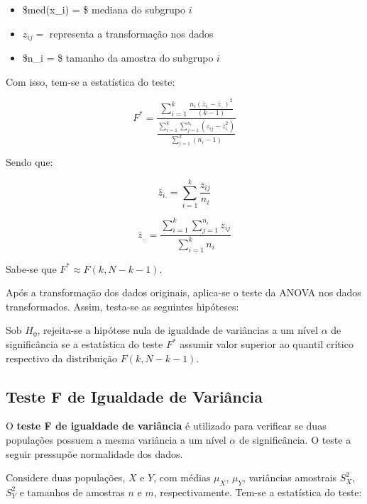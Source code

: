 \documentclass[
]{estat/estat}
\providecommand{\tightlist}{%
  \setlength{\itemsep}{0pt}\setlength{\parskip}{0pt}}\usepackage{longtable,booktabs,array}
\begin{document}
\begin{itemize}
\tightlist
\item
  \$med(x\_i) = \$ mediana do subgrupo \(i\)
\item
  \(z_{ij} =\) representa a transformação nos dados
\item
  \$n\_i = \$ tamanho da amostra do subgrupo \(i\)
\end{itemize}

Com isso, tem-se a estatística do teste:

\begin{equation}
F^* = \frac{\displaystyle \sum_{i=1}^{k}\frac{n_i(\bar{z}_{i.} - \bar{z}_{..})^2}{(k-1)}}{\frac{\displaystyle \sum_{i=1}^{k}\displaystyle \sum_{j=1}^{n_i}(z_{ij}-\bar{z}_{i.}^2)}{\displaystyle \sum_{i=1}^{k}(n_i-1)}} \nonumber
\end{equation}

Sendo que:

\[ \bar{z}_{i.} = \sum_{i=1}^{k}\frac{z_{ij}}{n_{i}} \]

\[ \bar{z}_{..} = \frac{\displaystyle \sum_{i=1}^{k}\displaystyle\sum_{j=1}^{n_i}z_{ij}}{\displaystyle\sum_{i=1}^{k}n_i} \]

Sabe-se que \(F^* \approx F(k,N-k-1)\).

Após a transformação dos dados originais, aplica-se o teste da ANOVA nos
dados transformados. Assim, testa-se as seguintes hipóteses:


Sob \(H_0\), rejeita-se a hipótese nula de igualdade de variâncias a um
nível \(\alpha\) de significância se a estatística do teste \(F^*\)
assumir valor superior ao quantil crítico respectivo da distribuição
\(F(k,N-k-1)\).

\hypertarget{teste-f-de-igualdade-de-variuxe2ncia}{%
\subsection{Teste F de Igualdade de
Variância}\label{teste-f-de-igualdade-de-variuxe2ncia}}

O \textbf{teste F de igualdade de variância} é utilizado para verificar
se duas populações possuem a mesma variância a um nível \(\alpha\) de
significância. O teste a seguir pressupõe normalidade dos dados.

Considere duas populações, \(X\) e \(Y\), com médias \(\mu_X\),
\(\mu_Y\), variâncias amostrais \(S^2_X\), \(S^2_Y\) e tamanhos de
amostras \(n\) e \(m\), respectivamente. Tem-se a estatística do teste:
\end{document}
